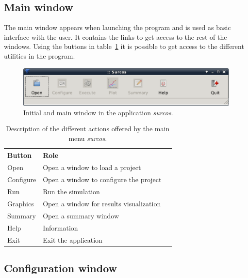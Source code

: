 \documentclass[review,authoryear]{elsarticle}
\begin{document}

\subsection{Main window}

The main window appears when launching the program and is used as basic
interface with the user. It contains the links to get access to the rest of the
windows. Using the buttons in table~\ref{mainWindowIcons} it is possible to get
access to the different utilities in the program.

\newlength{\UNIT}
\setlength{\UNIT}{0.0107cm}

\begin{figure}[!ht]
\begin{center}
\includegraphics[width=643\UNIT]{mprincipalEN.eps}
\caption{Initial and main window in the application \emph{surcos}.}
	\label{mainWindow}
\end{center}
\end{figure}

\begin{table}[!ht]\footnotesize
\caption{Description of the different actions offered by the main menu
	\emph{surcos}.}\label{mainWindowIcons}
\begin{center}
\begin{tabular}{llr}
\hline
Button & Role \\
\hline
Open & Open a window to load a project \\
Configure & Open a window to configure the project \\
Run & Run the simulation \\
Graphics & Open a window for results visualization \\
Summary & Open a summary window \\
Help & Information \\
Exit & Exit the application \\
\hline
\end{tabular}
\end{center}
\end{table}

\subsection{Configuration window}
\end{document}
